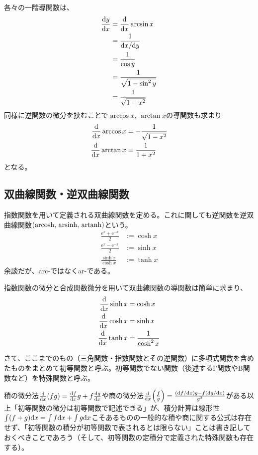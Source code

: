 各々の一階導関数は、
\begin{align}
    \begin{aligned}
        \frac{\mathrm{d}y}{\mathrm{d}x} & =\frac{\mathrm{d}}{\mathrm{d}x}\arcsin x        \\
                    & =\frac{1}{\mathrm{d}x/\mathrm{d}y}          \\
                    & =\frac{1}{\cos y}           \\
                    & =\frac{1}{\sqrt{1-\sin^2y}} \\
                    & =\frac{1}{\sqrt{1-x^2}}
    \end{aligned}
\end{align}
同様に逆関数の微分を挟むことで$\arccos x,\,\arctan x$の導関数も求まり
\begin{align}
    \frac{\mathrm{d}}{\mathrm{d}x}\arccos x & =-\frac{1}{\sqrt{1-x^2}} \\
    \frac{\mathrm{d}}{\mathrm{d}x}\arctan x & =\frac{1}{1+x^2}
\end{align}
となる。
\subsection{双曲線関数・逆双曲線関数}
指数関数を用いて定義される双曲線関数を定める。これに関しても逆関数を逆双曲線関数$\pare{\arcosh,\,\arsinh,\,\artanh}$という。
\begin{align}
    \frac{\mathrm{e}^x+\mathrm{e}^{-x}}{2} & :=\cosh x \\
    \frac{\mathrm{e}^x-\mathrm{e}^{-x}}{2} & :=\sinh x \\
    \frac{\sinh x}{\cosh x}                & :=\tanh x
\end{align}
余談だが、arc-ではなくar-である。

指数関数の微分と合成関数微分を用いて双曲線関数の導関数は簡単に求まり、
\begin{align}
    \begin{aligned}
        \frac{\mathrm{d}}{\mathrm{d}x}\sinh x & =\cosh x            \\
        \frac{\mathrm{d}}{\mathrm{d}x}\cosh x & =\sinh x            \\
        \frac{\mathrm{d}}{\mathrm{d}x}\tanh x & =\frac{1}{\cosh^2x}
    \end{aligned}
\end{align}
\baselineskip

さて、ここまでのもの（三角関数・指数関数とその逆関数）に多項式関数を含めたものをまとめて初等関数と呼ぶ。初等関数でない関数（後述するΓ関数やΒ関数など）を特殊関数と呼ぶ。

積の微分法$\opdiff{x}\pare{fg}=\diff{f}xg+f\diff{g}x$や商の微分法$\opdiff{x}\pare{\frac{f}g}=\frac{\pare{\df/\dx}g-f\pare{\dg/\dx}}{g^2}$がある以上「初等関数の微分は初等関数で記述できる」が、積分計算は線形性$\int\pare{f+g}\dx=\int f\dx+\int g\dx$こそあるものの一般的な積や商に関する公式は存在せず、「初等関数の積分が初等関数で表されるとは限らない」ことは書き記しておくべきことであろう（そして、初等関数の定積分で定義された特殊関数も存在する）。

